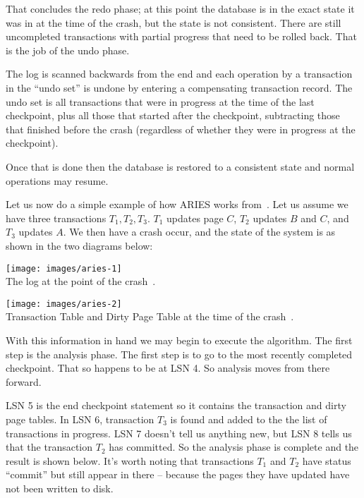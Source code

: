 That concludes the redo phase; at this point the database is in the exact state it was in at the time of the crash, but the state is not consistent. There are still uncompleted transactions with partial progress that need to be rolled back. That is the job of the undo phase.

The log is scanned backwards from the end and each operation by a transaction in the ``undo set'' is undone by entering a compensating transaction record. The undo set is all transactions that were in progress at the time of the last checkpoint, plus all those that started after the checkpoint, subtracting those that finished before the crash (regardless of whether they were in progress at the checkpoint). 

Once that is done then the database is restored to a consistent state and normal operations may resume. 

Let us now do a simple example of how ARIES works from~\cite{fds}. Let us assume we have three transactions $T_{1}, T_{2}, T_{3}$. $T_{1}$ updates page $C$, $T_{2}$ updates $B$ and $C$, and $T_{3}$ updates $A$. We then have a crash occur, and the state of the system is as shown in the two diagrams below:

\begin{center}
\texttt{[image: images/aries-1]}\\
The log at the point of the crash~\cite{fds}.
\end{center}

\begin{center}
\texttt{[image: images/aries-2]}\\
Transaction Table and Dirty Page Table at the time of the crash~\cite{fds}.
\end{center}

With this information in hand we may begin to execute the algorithm. The first step is the analysis phase. The first step is to go to the most recently completed checkpoint. That so happens to be at LSN 4. So analysis moves from there forward. 

LSN 5 is the end checkpoint statement so it contains the transaction and dirty page tables. In LSN 6, transaction $T_{3}$ is found and added to the the list of transactions in progress. LSN 7 doesn't tell us anything new, but LSN 8 tells us that the transaction $T_{2}$ has committed. So the analysis phase is complete and the result is shown below. It's worth noting that transactions $T_{1}$ and $T_{2}$ have status ``commit'' but still appear in there -- because the pages they have updated have not been written to disk. 

